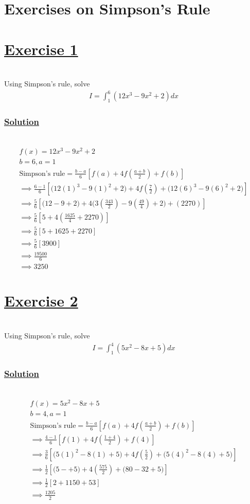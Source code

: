 \documentclass[12pt]{report}
\newcommand{\ubt}[1]{\textbf{\underline{#1}}}
\newcommand{\spn}[1]{\\[#1cm]}
\newcommand{\solution}{\subsubsection{\ubt{Solution}}{~}\spn{-1}}
\newcommand{\exercise}[1]{\section*{\ubt{Exercise #1}}{~}\spn{-1}}
\begin{document}
		\section{Exercises on Simpson's Rule}
	\exercise{1}
	Using Simpson's rule, solve
	\begin{eqnarray*}
		I = \int_1^6 (12x^3 - 9x^2 + 2) dx
	\end{eqnarray*}
	\solution
	\begin{gather*}
		f(x) = 12x^3 - 9x^2 + 2\\
		b=6, a=1\\
		\text{Simpson's rule} = \frac{b-a}{6}\left[f(a) + 4f\left(\frac{a+b}{2}\right) + f(b)\right]\\
		\implies \frac{6-1}{6}\left[\bigg(12(1)^3 - 9(1)^2 + 2\bigg) + 4f\left(\frac{7}{2}\right) + \bigg(12(6)^3 - 9(6)^2 + 2\bigg) \right]\\
		\implies \frac{5}{6}\left[\bigg(12 - 9 + 2\bigg) + 4\bigg(3\left(\frac{343}{2}\right)- 9\left(\frac{49}{4}\right) + 2\bigg) + (2270) \right]\\
		\implies\frac{5}{6}\left[5 + 4\left(\frac{1625}{4} + 2270\right)\right]\\
		\implies\frac{5}{6}\left[5 + 1625 + 2270\right]\\
		\implies\frac{5}{6}\left[3900\right]\\
		\implies\frac{19500}{6}\\
		\implies 3250
	\end{gather*}
	\newpage
	\exercise{2}
	Using Simpson's rule, solve
	\begin{gather*}
		I=\int_1^4(5x^2-8x+5)dx
	\end{gather*}
	\solution
	\begin{gather*}
		f(x) = 5x^2 - 8x + 5\\
		b=4, a=1\\
		\text{Simpson's rule} = \frac{b-a}{6}\left[f(a) + 4f\left(\frac{a+b}{2}\right) + f(b)\right]\\
		\implies \frac{4-1}{6}\left[f(1) + 4f\left(\frac{1+4}{2}\right) + f(4)\right]\\
		\implies \frac{3}{6}\left[\bigg(5(1)^2 - 8(1) + 5\bigg) + 4f\left(\frac{5}{2}\right) + \bigg(5(4)^2 - 8(4)+5\bigg)\right]\\
		\implies \frac{1}{2}\left[\bigg(5 -  + 5\bigg) + 4\left(\frac{575}{2}\right) + \bigg(80 - 32 + 5\bigg)\right]\\
		\implies \frac{1}{2}\left[2+1150 + 53\right]\\
		\implies \frac{1205}{2}
	\end{gather*}
	
\end{document}
